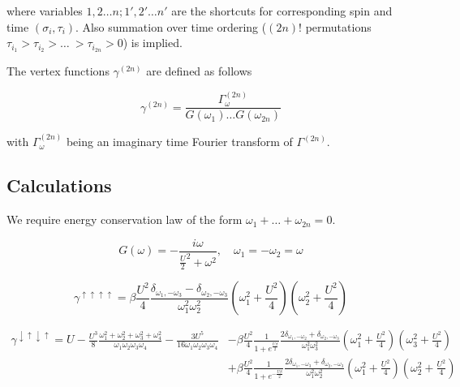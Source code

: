 where variables $1,2\dots n;1',2'\dots n'$ are the shortcuts for corresponding spin and time $(\sigma_i,\tau_i)$.
Also summation over time ordering ($(2n)!$ permutations $\tau_{i_1}>\tau_{i_2}>\dots\ >\tau_{i_{2n}}>0$) is implied.

The vertex functions $\gamma^{(2n)}$ are defined as follows

\[ \gamma^{(2n)} = \frac{\Gamma_\omega^{(2n)}}{G(\omega_1)\dots G(\omega_{2n})} \]

with $\Gamma_\omega^{(2n)}$ being an imaginary time Fourier transform of $\Gamma^{(2n)}$.

\subsection{Calculations}

We require energy conservation law of the form $\omega_1+\dots+\omega_{2n}=0$.

\[ G(\omega) = -\frac{i\omega}{\frac{U}{2}^2+\omega^2},\quad \omega_1=-\omega_2=\omega\]

\[ \gamma^{\uparrow\uparrow\uparrow\uparrow} = \beta \frac{U^2}{4}\frac{\delta_{\omega_1,-\omega_3}-\delta_{\omega_2,-\omega_3}}{\omega_1^2\omega_2^2}
  (\omega_1^2+\frac{U^2}{4})(\omega_2^2+\frac{U^2}{4}) \]

\begin{align*}
 \gamma^{\downarrow\uparrow\downarrow\uparrow} = 
 U - \frac{U^3}{8}\frac{\omega_1^2+\omega_2^2+\omega_3^2+\omega_4^2}{\omega_1\omega_2\omega_3\omega_4}
   - \frac{3U^5}{16\omega_1\omega_2\omega_3\omega_4}
  &- \beta\frac{U^2}{4}\frac{1}{1+e^{\frac{U\beta}{2}}}\frac{2\delta_{\omega_1,-\omega_2}+\delta_{\omega_2,-\omega_3}}{\omega_1^2\omega_3^2}(\omega_1^2+\frac{U^2}{4})(\omega_3^2+\frac{U^2}{4}) \\
  &+ \beta\frac{U^2}{4}\frac{1}{1+e^{-\frac{U\beta}{2}}}\frac{2\delta_{\omega_1,-\omega_3}+\delta_{\omega_2,-\omega_3}}{\omega_1^2\omega_2^2}(\omega_1^2+\frac{U^2}{4})(\omega_2^2+\frac{U^2}{4})   
\end{align*}

